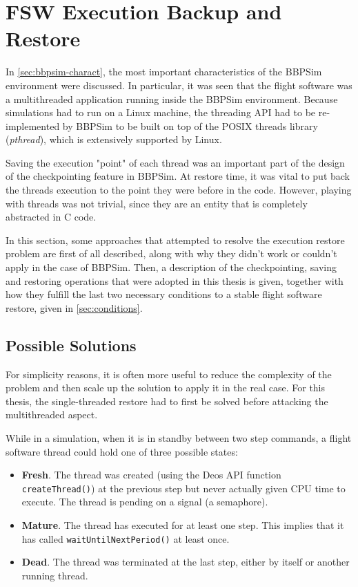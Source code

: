 \section{FSW Execution Backup and Restore}\label{sec:das-exec-restore}
In \autoref{sec:bbpsim-charact}, the most important characteristics of the BBPSim environment were discussed. In particular, it was seen that the flight software was a multithreaded application running inside the \gls{BBPSim} environment. Because simulations had to run on a Linux machine, the threading API had to be re-implemented by BBPSim to be built on top of the POSIX threads library (\textit{pthread}), which is extensively supported by Linux. 

Saving the execution "point" of each thread was an important part of the design of the checkpointing feature in BBPSim. At restore time, it was vital to put back the threads execution to the point they were before in the code. However, playing with threads was not trivial, since they are an entity that is completely abstracted in C code.

In this section, some approaches that attempted to resolve the execution restore problem are first of all described, along with why they didn't work or couldn't apply in the case of BBPSim. Then, a description of the checkpointing, saving and restoring operations that were adopted in this thesis is given, together with how they fulfill the last two necessary conditions to a stable flight software restore, given in \autoref{sec:conditions}. 

\subsection*{Possible Solutions}
For simplicity reasons, it is often more useful to reduce the complexity of the problem and then scale up the solution to apply it in the real case. For this thesis, the single-threaded restore had to first be solved before attacking the multithreaded aspect. 

While in a simulation, when it is in standby between two step commands, a flight software thread could hold one of three possible states:
\begin{itemize}
	\item \textbf{Fresh}. The thread was created (using the Deos API function \texttt{createThread()}) at the previous step but never actually given CPU time to execute. The thread is pending on a signal (a semaphore).
	\item \textbf{Mature}. The thread has executed for at least one step. This implies that it has called \texttt{waitUntilNextPeriod()} at least once.
	\item \textbf{Dead}. The thread was terminated at the last step, either by itself or another running thread.
\end{itemize}

